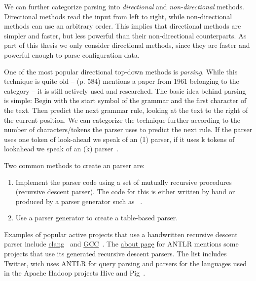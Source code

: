 We can further categorize parsing into \emph{directional} and \emph{non-directional} methods. Directional methods read the input from left to right, while non-directional methods can use an arbitrary order. This implies that directional methods are simpler and faster, but less powerful than their non-directional counterparts. As part of this thesis we only consider directional methods, since they are faster and powerful enough to parse configuration data.

One of the most popular directional top-down methods is \emph{ parsing}. While this technique is quite old –  (p. 584) mentions a paper from 1961 belonging to the  category – it is still actively used and researched. The basic idea behind  parsing is simple: Begin with the start symbol of the grammar and the first character of the text. Then predict the next grammar rule, looking at the text to the right of the current position. We can categorize the technique further according to the number of characters/tokens the parser uses to predict the next rule. If the parser uses one token of look-ahead we speak of an (1) parser, if it uses k tokens of lookahead we speak of an (k) parser~\cite{rosenkrantz1969properties}.

Two common methods to create an  parser are:

\begin{enumerate}

  \item Implement the parser code using a set of mutually recursive procedures (recursive descent parser). The code for this is either written by hand or produced by a parser generator such as ~\cite{parr2013recursive}.

  \item Use a parser generator to create a table-based parser.

\end{enumerate}

Examples of popular active projects that use a handwritten recursive descent parser include \href{http://clang.llvm.org}{clang}~\cite{bendersky2012clang} and \href{http://gcc.gnu.org}{GCC}~\cite{myers2008cparser}. The \href{http://www.antlr.org/about.html}{about page} for \gls{ANTLR} mentions some projects that use its generated recursive descent parsers. The list includes Twitter, wich uses ANTLR for query parsing and parsers for the languages used in the Apache Hadoop projects Hive and Pig~\cite{parr2013definitive}.

